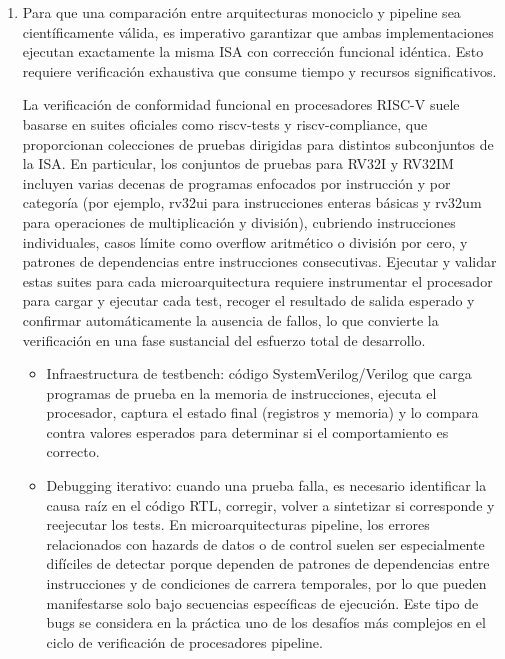 \begin{enumerate}
\begin{itemize}
            \item Manejo de branches: detección temprana de saltos en etapa ID o EX, cálculo de dirección de salto, lógica de flush del pipeline cuando branch es taken (descartando instrucciones incorrectamente fetched), y opcionalmente, branch prediction con tablas de historia y actualización dinámica \parencite{Patterson2017Computer}.

        \end{itemize}

        \item Para que una comparación entre arquitecturas monociclo y pipeline sea científicamente válida, es imperativo garantizar que ambas implementaciones ejecutan exactamente la misma ISA con corrección funcional idéntica. Esto requiere verificación exhaustiva que consume tiempo y recursos significativos.

           La verificación de conformidad funcional en procesadores RISC-V suele basarse en suites oficiales como riscv-tests y riscv-compliance, que proporcionan colecciones de pruebas dirigidas para distintos subconjuntos de la ISA. En particular, los conjuntos de pruebas para RV32I y RV32IM incluyen varias decenas de programas enfocados por instrucción y por categoría (por ejemplo, rv32ui para instrucciones enteras básicas y rv32um para operaciones de multiplicación y división), cubriendo instrucciones individuales, casos límite como overflow aritmético o división por cero, y patrones de dependencias entre instrucciones consecutivas.  Ejecutar y validar estas suites para cada microarquitectura requiere instrumentar el procesador para cargar y ejecutar cada test, recoger el resultado de salida esperado y confirmar automáticamente la ausencia de fallos, lo que convierte la verificación en una fase sustancial del esfuerzo total de desarrollo.

           \begin{itemize}
            \item Infraestructura de testbench: código SystemVerilog/Verilog que carga programas de prueba en la memoria de instrucciones, ejecuta el procesador, captura el estado final (registros y memoria) y lo compara contra valores esperados para determinar si el comportamiento es correcto.
            
            \item Debugging iterativo: cuando una prueba falla, es necesario identificar la causa raíz en el código RTL, corregir, volver a sintetizar si corresponde y reejecutar los tests. En microarquitecturas pipeline, los errores relacionados con hazards de datos o de control suelen ser especialmente difíciles de detectar porque dependen de patrones de dependencias entre instrucciones y de condiciones de carrera temporales, por lo que pueden manifestarse solo bajo secuencias específicas de ejecución. Este tipo de bugs se considera en la práctica uno de los desafíos más complejos en el ciclo de verificación de procesadores pipeline.


\end{itemize}
\end{enumerate}

